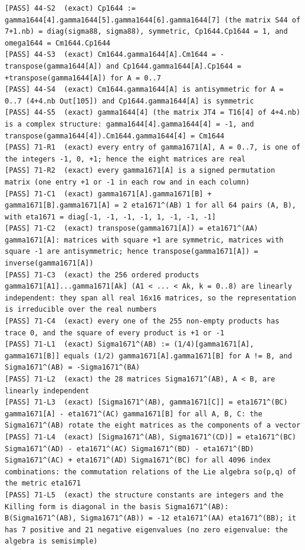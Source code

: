 \documentclass[
  10pt,
]{article}
\begin{document}
\begin{verbatim}
[PASS] 44-S2  (exact) Cp1644 := gamma1644[4].gamma1644[5].gamma1644[6].gamma1644[7] (the matrix S44 of 7+1.nb) = diag(sigma88, sigma88), symmetric, Cp1644.Cp1644 = 1, and omega1644 = Cm1644.Cp1644
[PASS] 44-S3  (exact) Cm1644.gamma1644[A].Cm1644 = -transpose(gamma1644[A]) and Cp1644.gamma1644[A].Cp1644 = +transpose(gamma1644[A]) for A = 0..7
[PASS] 44-S4  (exact) Cm1644.gamma1644[A] is antisymmetric for A = 0..7 (4+4.nb Out[105]) and Cp1644.gamma1644[A] is symmetric
[PASS] 44-S5  (exact) gamma1644[4] (the matrix JT4 = T16[4] of 4+4.nb) is a complex structure: gamma1644[4].gamma1644[4] = -1, and transpose(gamma1644[4]).Cm1644.gamma1644[4] = Cm1644
[PASS] 71-R1  (exact) every entry of gamma1671[A], A = 0..7, is one of the integers -1, 0, +1; hence the eight matrices are real
[PASS] 71-R2  (exact) every gamma1671[A] is a signed permutation matrix (one entry +1 or -1 in each row and in each column)
[PASS] 71-C1  (exact) gamma1671[A].gamma1671[B] + gamma1671[B].gamma1671[A] = 2 eta1671^(AB) 1 for all 64 pairs (A, B), with eta1671 = diag[-1, -1, -1, -1, 1, -1, -1, -1]
[PASS] 71-C2  (exact) transpose(gamma1671[A]) = eta1671^(AA) gamma1671[A]: matrices with square +1 are symmetric, matrices with square -1 are antisymmetric; hence transpose(gamma1671[A]) = inverse(gamma1671[A])
[PASS] 71-C3  (exact) the 256 ordered products gamma1671[A1]...gamma1671[Ak] (A1 < ... < Ak, k = 0..8) are linearly independent: they span all real 16x16 matrices, so the representation is irreducible over the real numbers
[PASS] 71-C4  (exact) every one of the 255 non-empty products has trace 0, and the square of every product is +1 or -1
[PASS] 71-L1  (exact) Sigma1671^(AB) := (1/4)[gamma1671[A], gamma1671[B]] equals (1/2) gamma1671[A].gamma1671[B] for A != B, and Sigma1671^(AB) = -Sigma1671^(BA)
[PASS] 71-L2  (exact) the 28 matrices Sigma1671^(AB), A < B, are linearly independent
[PASS] 71-L3  (exact) [Sigma1671^(AB), gamma1671[C]] = eta1671^(BC) gamma1671[A] - eta1671^(AC) gamma1671[B] for all A, B, C: the Sigma1671^(AB) rotate the eight matrices as the components of a vector
[PASS] 71-L4  (exact) [Sigma1671^(AB), Sigma1671^(CD)] = eta1671^(BC) Sigma1671^(AD) - eta1671^(AC) Sigma1671^(BD) - eta1671^(BD) Sigma1671^(AC) + eta1671^(AD) Sigma1671^(BC) for all 4096 index combinations: the commutation relations of the Lie algebra so(p,q) of the metric eta1671
[PASS] 71-L5  (exact) the structure constants are integers and the Killing form is diagonal in the basis Sigma1671^(AB): B(Sigma1671^(AB), Sigma1671^(AB)) = -12 eta1671^(AA) eta1671^(BB); it has 7 positive and 21 negative eigenvalues (no zero eigenvalue: the algebra is semisimple)

\end{verbatim}
\end{document}
